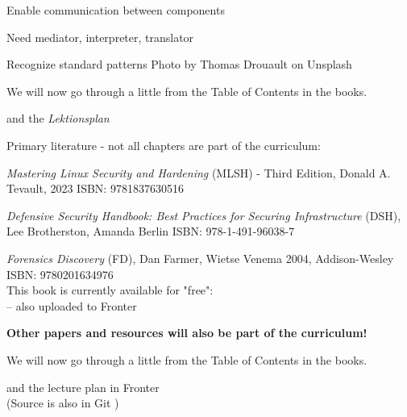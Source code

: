 \documentclass[Screen16to9,17pt]{foils}
\begin{document}



\begin{list2}
\item Enable communication between components
\item Need mediator, interpreter, translator
\item Recognize standard patterns \hfill Photo by Thomas Drouault on Unsplash
\end{list2}



We will now go through a little from the Table of Contents in the books.

and the \emph{Lektionsplan}\\



Primary literature - not all chapters are part of the curriculum:
\begin{list2}
\item
\emph{Mastering Linux Security and Hardening} (MLSH) - Third Edition, Donald A. Tevault, 2023 ISBN: 9781837630516
\item \emph{Defensive Security Handbook: Best Practices for Securing Infrastructure} (DSH), Lee Brotherston, Amanda Berlin ISBN: 978-1-491-96038-7
\item \emph{Forensics Discovery} (FD), Dan Farmer, Wietse Venema 2004, Addison-Wesley\\
ISBN: 9780201634976\\
This book is currently available for "free":\\
 -- also uploaded to Fronter


\end{list2}

{\bf Other papers and resources will also be part of the curriculum!}



We will now go through a little from the Table of Contents in the books.

and the lecture plan in Fronter\\
(Source is also in Git  )
\end{document}
